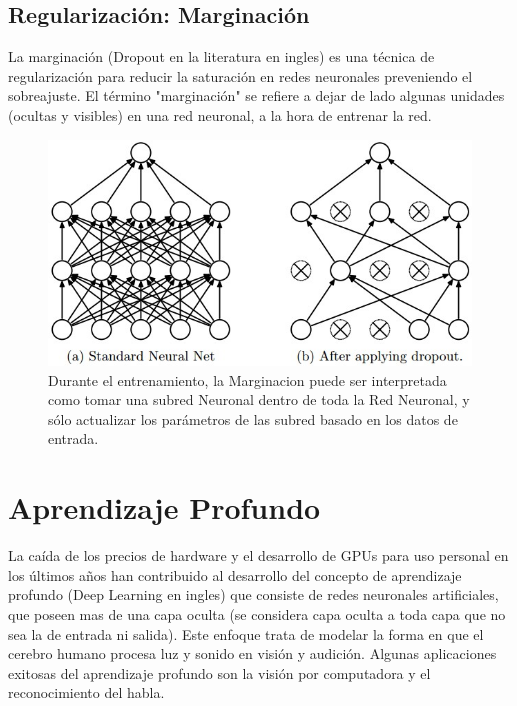 \documentclass[a4paper,11pt,spanish]{book}
\begin{document}
      \subsection {Regularización: Marginación}
	La marginación (Dropout en la literatura en ingles) es una técnica de regularización para reducir la saturación en redes neuronales preveniendo el sobreajuste.
	El término "marginación" se refiere a dejar de lado algunas unidades (ocultas y visibles) en una red neuronal, a la hora de entrenar la red.
	\begin{figure}[H]
	  \begin{center}
	   \includegraphics[width=0.6\linewidth]{./img/dropout.jpeg}
	  \end{center}
	  \caption{Durante el entrenamiento, la Marginacion puede ser interpretada como tomar una subred Neuronal dentro de toda la Red Neuronal, y sólo actualizar los parámetros
	  de las subred basado en los datos de entrada. \cite{Srivastava:Dropout} }
	  \label{fig:dropout}
	\end{figure}

  \section {Aprendizaje Profundo}
    La caída de los precios de hardware y el desarrollo de GPUs para uso personal en los últimos años han contribuido al desarrollo del concepto de aprendizaje profundo (Deep Learning en ingles)
    que consiste de redes neuronales artificiales, que poseen mas de una capa oculta (se considera capa oculta a toda capa que no sea la de entrada ni salida). Este enfoque trata de
    modelar la forma en que el cerebro humano procesa luz y sonido en visión y audición.
    Algunas aplicaciones exitosas del aprendizaje profundo son la visión por computadora y el reconocimiento del habla.
\end{document}
